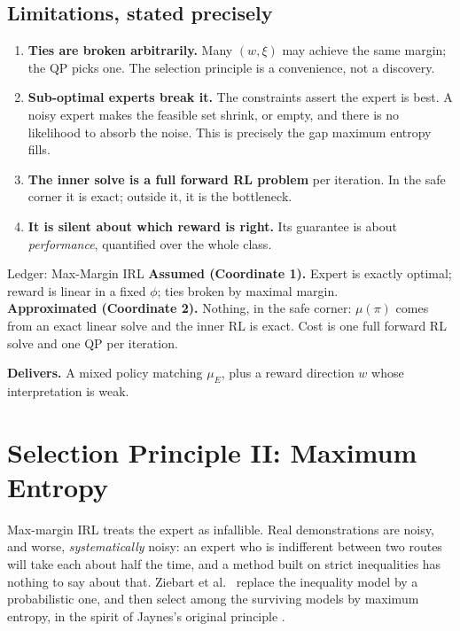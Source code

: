 \documentclass[11pt]{article}
\theoremstyle{plain}
\theoremstyle{definition}
\theoremstyle{remark}
\begin{document}
\subsection{Limitations, stated precisely}

\begin{enumerate}
\item \textbf{Ties are broken arbitrarily.} Many $(w,\xi)$ may achieve the
same margin; the QP picks one. The selection principle is a convenience,
not a discovery.
\item \textbf{Sub-optimal experts break it.} The constraints assert the
expert is best. A noisy expert makes the feasible set shrink, or empty,
and there is no likelihood to absorb the noise. This is precisely the gap
maximum entropy fills.
\item \textbf{The inner solve is a full forward RL problem} per iteration.
In the safe corner it is exact; outside it, it is the bottleneck.
\item \textbf{It is silent about which reward is right.} Its guarantee is
about \emph{performance}, quantified over the whole class.
\end{enumerate}

\begin{navybox}{Ledger: Max-Margin IRL}
\textbf{Assumed (Coordinate 1).} Expert is exactly optimal; reward is
linear in a fixed $\phi$; ties broken by maximal margin.\\
\textbf{Approximated (Coordinate 2).} Nothing, in the safe corner: $\mu(\pi)$
comes from an exact linear solve and the inner RL is exact. Cost is one
full forward RL solve and one QP per iteration.
\end{navybox}
\begin{navyplain}
\textbf{Delivers.} A mixed policy matching $\mu_E$, plus a reward
direction $w$ whose interpretation is weak.
\end{navyplain}

\section{Selection Principle II: Maximum Entropy}
\label{sec:maxent}

Max-margin IRL treats the expert as infallible. Real demonstrations are
noisy, and worse, \emph{systematically} noisy: an expert who is
indifferent between two routes will take each about half the time, and a
method built on strict inequalities has nothing to say about that. Ziebart
et al.\ \cite{ziebart2008} replace the inequality model by a probabilistic
one, and then select among the surviving models by maximum entropy, in the
spirit of Jaynes's original principle \cite{jaynes1957}.
\end{document}
